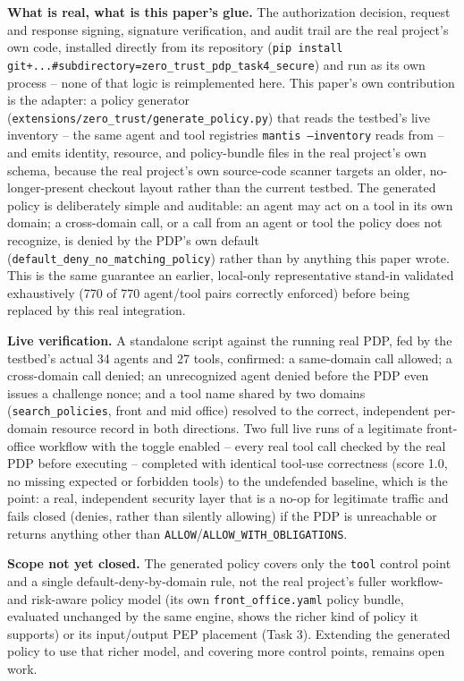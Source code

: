 \documentclass[conference]{IEEEtran}
\begin{document}
\textbf{What is real, what is this paper's glue.} The authorization decision, request and response signing, signature verification, and audit trail are the real project's own code, installed directly from its repository (\texttt{pip install git+...\#subdirectory=zero\_trust\_pdp\_task4\_secure}) and run as its own process -- none of that logic is reimplemented here. This paper's own contribution is the adapter: a policy generator (\texttt{extensions/zero\_trust/generate\_policy.py}) that reads the testbed's live inventory -- the same agent and tool registries \texttt{mantis --inventory} reads from -- and emits identity, resource, and policy-bundle files in the real project's own schema, because the real project's own source-code scanner targets an older, no-longer-present checkout layout rather than the current testbed. The generated policy is deliberately simple and auditable: an agent may act on a tool in its own domain; a cross-domain call, or a call from an agent or tool the policy does not recognize, is denied by the PDP's own default (\texttt{default\_deny\_no\_matching\_policy}) rather than by anything this paper wrote. This is the same guarantee an earlier, local-only representative stand-in validated exhaustively (770 of 770 agent/tool pairs correctly enforced) before being replaced by this real integration.

\textbf{Live verification.} A standalone script against the running real PDP, fed by the testbed's actual 34 agents and 27 tools, confirmed: a same-domain call allowed; a cross-domain call denied; an unrecognized agent denied before the PDP even issues a challenge nonce; and a tool name shared by two domains (\texttt{search\_policies}, front and mid office) resolved to the correct, independent per-domain resource record in both directions. Two full live runs of a legitimate front-office workflow with the toggle enabled -- every real tool call checked by the real PDP before executing -- completed with identical tool-use correctness (score 1.0, no missing expected or forbidden tools) to the undefended baseline, which is the point: a real, independent security layer that is a no-op for legitimate traffic and fails closed (denies, rather than silently allowing) if the PDP is unreachable or returns anything other than \texttt{ALLOW}/\texttt{ALLOW\_WITH\_OBLIGATIONS}.

\textbf{Scope not yet closed.} The generated policy covers only the \texttt{tool} control point and a single default-deny-by-domain rule, not the real project's fuller workflow- and risk-aware policy model (its own \texttt{front\_office.yaml} policy bundle, evaluated unchanged by the same engine, shows the richer kind of policy it supports) or its input/output PEP placement (Task 3). Extending the generated policy to use that richer model, and covering more control points, remains open work.
\end{document}
